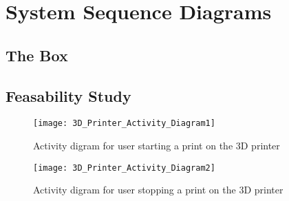 \chapter{System Sequence Diagrams}

\section{The Box}
\section{Feasability Study}
\begin{figure}[H]
\texttt{[image: 3D\_Printer\_Activity\_Diagram1]}
\caption{\label{figure:3D_Printer_Activity_Diagram1} Activity digram for user starting a print on the 3D printer}
\end{figure}

\begin{figure}[H]
\texttt{[image: 3D\_Printer\_Activity\_Diagram2]}
\caption{\label{figure:3D_Printer_Activity_Diagram2} Activity digram for user stopping a print on the 3D printer}
\end{figure}